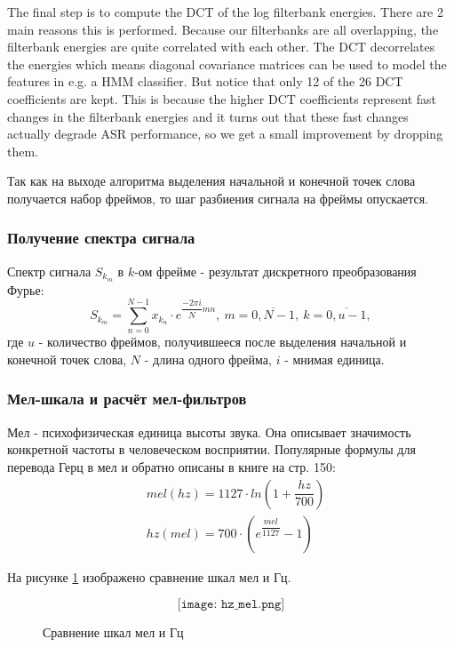 The final step is to compute the DCT of the log filterbank energies. There are 2 main reasons this is performed. Because our filterbanks are all overlapping, the filterbank energies are quite correlated with each other. The DCT decorrelates the energies which means diagonal covariance matrices can be used to model the features in e.g. a HMM classifier. But notice that only 12 of the 26 DCT coefficients are kept. This is because the higher DCT coefficients represent fast changes in the filterbank energies and it turns out that these fast changes actually degrade ASR performance, so we get a small improvement by dropping them.  
 
Так как на выходе алгоритма выделения начальной и конечной точек слова получается набор фреймов, то шаг разбиения сигнала на фреймы опускается.

\subsubsection{Получение спектра сигнала}
Спектр сигнала $S_{k_m}$ в $k$-ом фрейме - результат дискретного преобразования Фурье:
\begin{equation}
	S_{k_m} = \sum_{n=0}^{N-1} x_{k_n} \cdot e^{\dfrac{-2\pi i}{N}mn},~m=\overline{0,N-1},~k=\overline{0,u-1},
\end{equation}
где $u$ - количество фреймов, получившееся после выделения начальной и конечной точек слова, $N$ - длина одного фрейма, $i$ - мнимая единица.

\subsubsection{Мел-шкала и расчёт мел-фильтров}
Мел - психофизическая единица высоты звука. Она описывает значимость конкретной частоты в человеческом восприятии. 
Популярные формулы для перевода Герц в 
мел и обратно описаны в книге \cite{Mel} на стр. 150:
\begin{align}
	\label{eq:mel}
	&mel(hz) = 1127 \cdot ln(1 + \dfrac{hz}{700})\\
	\label{eq:hz}
	&hz(mel) = 700 \cdot (e^{\dfrac{mel}{1127}}-1)
\end{align}

На рисунке \ref{fig:hz_mel} изображено сравнение шкал мел и Гц.

\begin{figure}[H]
	\[\texttt{[image: hz\_mel.png]}\]
	\caption{Сравнение шкал мел и Гц}
	\label{fig:hz_mel}
\end{figure}


